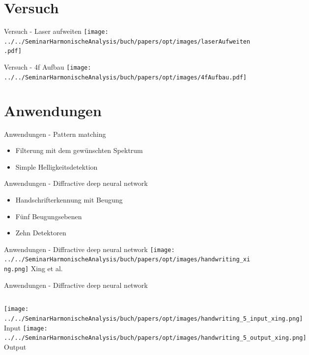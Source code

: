 \documentclass{beamer}
\begin{document}
\section{Versuch}

\begin{frame}{Versuch - Laser aufweiten}
    \centering
    \texttt{[image: ../../SeminarHarmonischeAnalysis/buch/papers/opt/images/laserAufweiten.pdf]}
\end{frame}

\begin{frame}{Versuch - 4f Aufbau}
    \texttt{[image: ../../SeminarHarmonischeAnalysis/buch/papers/opt/images/4fAufbau.pdf]}
\end{frame}

\section{Anwendungen}

\begin{frame}{Anwendungen - Pattern matching}
    \begin{itemize}
        \item Filterung mit dem gewünschten Spektrum
        \item Simple Helligkeitsdetektion
    \end{itemize}
\end{frame}

\begin{frame}{Anwendungen - Diffractive deep neural network}
    \begin{itemize}
        \item Handschrifterkennung mit Beugung
        \item Fünf Beugungsebenen
        \item Zehn Detektoren
    \end{itemize}
\end{frame}

\begin{frame}{Anwendungen - Diffractive deep neural network}
    \centering
    \texttt{[image: ../../SeminarHarmonischeAnalysis/buch/papers/opt/images/handwriting\_xing.png]}
    Xing et al. \cite{opt:Lin.2018}
\end{frame}

\begin{frame}{Anwendungen - Diffractive deep neural network}
    \begin{columns}
        \texttt{[image: ../../SeminarHarmonischeAnalysis/buch/papers/opt/images/handwriting\_5\_input\_xing.png]}
        Input
        \texttt{[image: ../../SeminarHarmonischeAnalysis/buch/papers/opt/images/handwriting\_5\_output\_xing.png]}
        Output
    \end{columns}
\end{frame}
\end{document}
